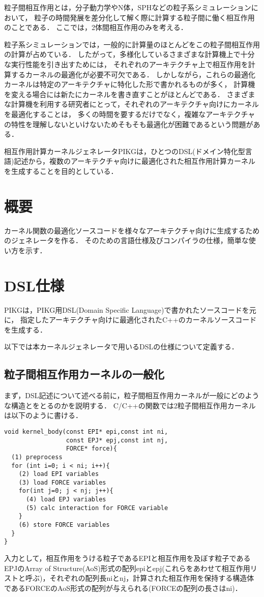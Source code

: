 \documentclass{article}
\begin{document}
粒子間相互作用とは，分子動力学やN体，SPHなどの粒子系シミュレーションにおいて，
粒子の時間発展を差分化して解く際に計算する粒子間に働く相互作用のことである．
ここでは，2体間相互作用のみを考える．

粒子系シミュレーションでは，一般的に計算量のほとんどをこの粒子間相互作用の計算が占めている．
したがって，多様化しているさまざまな計算機上で十分な実行性能を引き出すためには，
それぞれのアーキテクチャ上で相互作用を計算するカーネルの最適化が必要不可欠である．
しかしながら，これらの最適化カーネルは特定のアーキテクチャに特化した形で書かれるものが多く，
計算機を変える場合には新たにカーネルを書き直すことがほとんどである．
さまざまな計算機を利用する研究者にとって，それぞれのアーキテクチャ向けにカーネルを最適化することは，
多くの時間を要するだけでなく，複雑なアーキテクチャの特性を理解しないといけないためそもそも最適化が困難であるという問題がある．

相互作用計算カーネルジェネレータPIKGは，ひとつのDSL(ドメイン特化型言語)記述から，複数のアーキテクチャ向けに最適化された相互作用計算カーネルを生成することを目的としている．

\section{概要}
カーネル関数の最適化ソースコードを様々なアーキテクチャ向けに生成するためのジェネレータを作る．
そのための言語仕様及びコンパイラの仕様，簡単な使い方を示す．

\section{DSL仕様}
PIKGは，PIKG用DSL(Domain Specific Language)で書かれたソースコードを元に，
指定したアーキテクチャ向けに最適化されたC++のカーネルソースコードを生成する．

以下では本カーネルジェネレータで用いるDSLの仕様について定義する．

\subsection{粒子間相互作用カーネルの一般化}
まず，DSL記述について述べる前に，粒子間相互作用カーネルが一般にどのような構造とをとるのかを説明する．
C/C++の関数では2粒子間相互作用カーネルは以下のように書ける．
\begin{verbatim}
void kernel_body(const EPI* epi,const int ni,
                 const EPJ* epj,const int nj,
                 FORCE* force){
  (1) preprocess
  for (int i=0; i < ni; i++){
    (2) load EPI variables
    (3) load FORCE variables
    for(int j=0; j < nj; j++){
      (4) load EPJ variables
      (5) calc interaction for FORCE variable
    }
    (6) store FORCE variables
  }
}
\end{verbatim}
入力として，相互作用をうける粒子であるEPIと相互作用を及ぼす粒子であるEPJのArray of Structure(AoS)形式の配列epiとepj(これらをあわせて相互作用リストと呼ぶ)，それぞれの配列長niとnj，計算された相互作用を保持する構造体であるFORCEのAoS形式の配列が与えられる(FORCEの配列の長さはni)．
\end{document}
